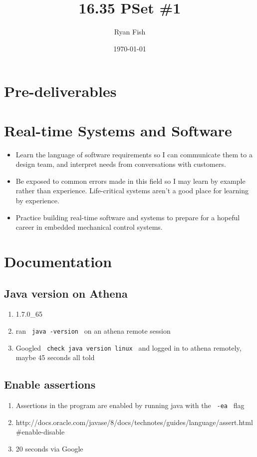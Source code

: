 \documentclass{article}
\title{16.35 PSet \#1}
\author{Ryan Fish}
\date{\today}
\begin{document}
\maketitle

\section*{Pre-deliverables}
\section{Real-time Systems and Software}
\begin{itemize}
\item Learn the language of software requirements so I can communicate them to a design team, and interpret needs from conversations with customers.
\item Be exposed to common errors made in this field so I may learn by example rather than experience.  Life-critical systems aren't a good place for learning by experience.
\item Practice building real-time software and systems to prepare for a hopeful career in embedded mechanical control systems.
\end{itemize}
\section{Documentation}
\subsection{Java version on Athena}
\begin{enumerate}
	\item 1.7.0\_65
	\item ran \verb! java -version ! on an athena remote session
	\item Googled \verb| check java version linux | and logged in to athena remotely, maybe 45 seconds all told
\end{enumerate}


\subsection{Enable assertions}
\begin{enumerate}
	\item  Assertions in the program are enabled by running java with the \verb| -ea | flag
	\item http://docs.oracle.com/javase/8/docs/technotes/guides/language/assert.html\#enable-disable
	\item 20 seconds via Google
\end{enumerate}
\end{document}
